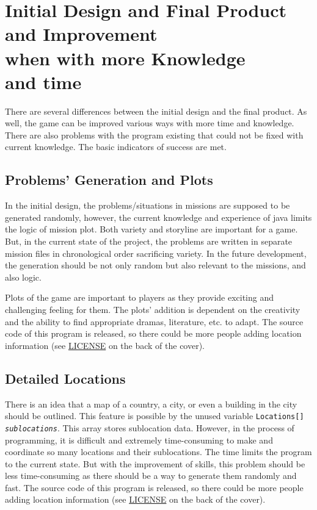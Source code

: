 \documentclass[letterpaper, 11pt]{report}
\begin{document}
\chapter{Initial Design and Final Product\\ and Improvement\\when with more Knowledge\\and time}
There are several differences between the initial design and the final product. As well, the game can be improved various ways with more time and knowledge. There are also problems with the program existing that could not be fixed with current knowledge. The basic indicators of success are met.

\section{Problems' Generation and Plots}
In the initial design, the problems/situations in missions are supposed to be generated randomly, however, the current knowledge and experience of java limits the logic of mission plot. Both variety and storyline are important for a game. But, in the current state of the project, the problems are written in separate mission files in chronological order sacrificing variety. In the future development, the generation should be not only random but also relevant to the missions, and also logic.

Plots of the game are important to players as they provide exciting and challenging feeling for them. The plots' addition is dependent on the creativity and the ability to find appropriate dramas, literature, etc. to adapt. The source code of this program is released, so there could be more people adding location information (see \hyperref[chap:LICENSE]{LICENSE} on the back of the cover).

\section{Detailed Locations}
There is an idea that a map of a country, a city, or even a building in the city should be outlined. This feature is possible by the unused variable \texttt{Locations[] \textit{sublocations}}. This array stores sublocation data. However, in the process of programming, it is difficult and extremely time-consuming to make and coordinate so many locations and their sublocations. The time limits the program to the current state. But with the improvement of skills, this problem should be less time-consuming as there should be a way to generate them randomly and fast. The source code of this program is released, so there could be more people adding location information (see \hyperref[chap:LICENSE]{LICENSE} on the back of the cover).
\end{document}
